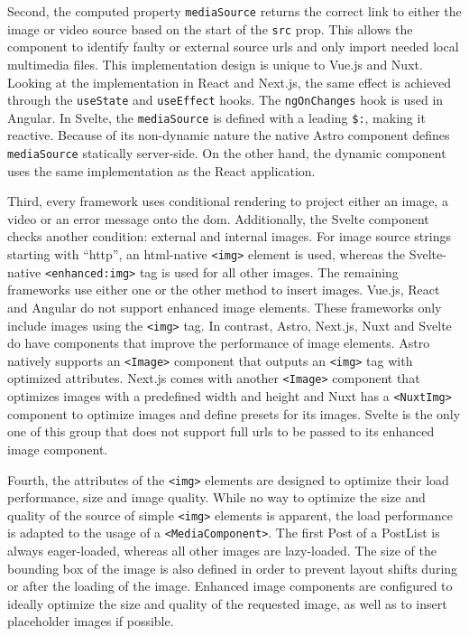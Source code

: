 \documentclass[a4paper, 12pt]{article}
\begin{document}
Second, the computed property \verb|mediaSource| returns the correct link to either the image or video source based on the start of the \verb|src| prop.
This allows the component to identify faulty or external source \acrshort{url}s and only import needed local multimedia files.
This implementation design is unique to Vue.js and Nuxt.
Looking at the implementation in React and Next.js, the same effect is achieved through the \verb|useState| and \verb|useEffect| hooks.
The \verb|ngOnChanges| hook is used in Angular.
In Svelte, the \verb|mediaSource| is defined with a leading \verb|$:|, making it reactive. Because of its non-dynamic nature the native Astro component defines \verb|mediaSource| statically server-side.
On the other hand, the dynamic component uses the same implementation as the React application.

Third, every framework uses conditional rendering to project either an image, a video or an error message onto the \acrshort{dom}.
Additionally, the Svelte component checks another condition: external and internal images.
For image source strings starting with \enquote{http}, an \acrshort{html}-native \verb|<img>| element is used, whereas the Svelte-native \verb|<enhanced:img>| tag is used for all other images.
The remaining frameworks use either one or the other method to insert images.
Vue.js, React and Angular do not support enhanced image elements.
These frameworks only include images using the \verb|<img>| tag.
In contrast, Astro, Next.js, Nuxt and Svelte do have components that improve the performance of image elements.
Astro natively supports an \verb|<Image>| component that outputs an \verb|<img>| tag with optimized attributes.
Next.js comes with another \verb|<Image>| component that optimizes images with a predefined width and height and Nuxt has a \verb|<NuxtImg>| component to optimize images and define presets for its images.
Svelte is the only one of this group that does not support full \acrshort{url}s to be passed to its enhanced image component.

Fourth, the attributes of the \verb|<img>| elements are designed to optimize their load performance, size and image quality.
While no way to optimize the size and quality of the source of simple \verb|<img>| elements is apparent, the load performance is adapted to the usage of a \verb|<MediaComponent>|.
The first Post of a PostList is always eager-loaded, whereas all other images are lazy-loaded.
The size of the bounding box of the image is also defined in order to prevent layout shifts during or after the loading of the image.
Enhanced image components are configured to ideally optimize the size and quality of the requested image, as well as to insert placeholder images if possible.
\end{document}
